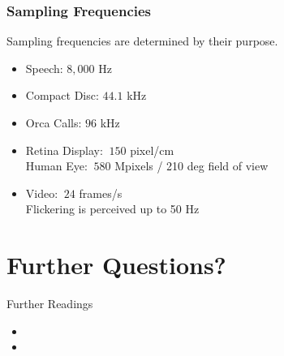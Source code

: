 \begin{frame}
    \frametitle{Sampling Frequencies}
    Sampling frequencies are determined by their purpose.\newline

    \begin{itemize}
        \item Speech: $8,000$ Hz
        \item Compact Disc: $44.1$ kHz
        \item Orca Calls: $96$ kHz
        \item Retina Display: $~ 150$ pixel/cm \\
                 Human Eye: $~580$ Mpixels / 210 deg field of view
        \item Video: $~24$ frames/s\\
                 Flickering is perceived up to 50 Hz
    \end{itemize}

    \vspace{5mm}

\end{frame}








\section{Further Questions?}

\begin{frame}[t]{Further Readings}
    \begin{itemize}
        \item {}
        \item {}
    \end{itemize}

\end{frame}



